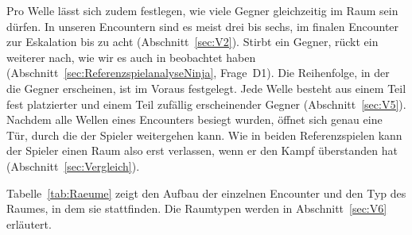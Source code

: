 \documentclass[../Main.tex]{subfiles}
\begin{document}
Pro Welle lässt sich zudem festlegen, wie viele Gegner gleichzeitig im Raum sein dürfen. In unseren Encountern sind es meist drei bis sechs, im finalen Encounter zur Eskalation bis zu acht (Abschnitt~\ref{sec:V2}). Stirbt ein Gegner, rückt ein weiterer nach, wie wir es auch in  beobachtet haben (Abschnitt~\ref{sec:ReferenzspielanalyseNinja}, Frage~D1). Die Reihenfolge, in der die Gegner erscheinen, ist im Voraus festgelegt. Jede Welle besteht aus einem Teil fest platzierter und einem Teil zufällig erscheinender Gegner (Abschnitt~\ref{sec:V5}). Nachdem alle Wellen eines Encounters besiegt wurden, öffnet sich genau eine Tür, durch die der Spieler weitergehen kann. Wie in beiden Referenzspielen kann der Spieler einen Raum also erst verlassen, wenn er den Kampf überstanden hat (Abschnitt~\ref{sec:Vergleich}).

Tabelle~\ref{tab:Raeume} zeigt den Aufbau der einzelnen Encounter und den Typ des Raumes, in dem sie stattfinden. Die Raumtypen werden in Abschnitt~\ref{sec:V6} erläutert.
\end{document}
